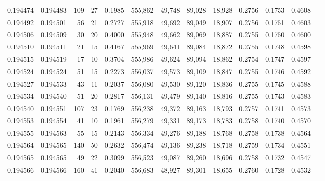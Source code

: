 \begin{tabular}{rrrrrrrrrrrrr}
0.194474 & 0.194483 &   109 &  27 &                                     0.1985 & 555,862 &  49,748 &  89,028 &  18,928 & 0.2756 & 0.1753 & 0.4608 \\
0.194492 & 0.194501 &    56 &  21 &                                     0.2727 & 555,918 &  49,692 &  89,049 &  18,907 & 0.2756 & 0.1751 & 0.4603 \\
0.194506 & 0.194509 &    30 &  20 &                                     0.4000 & 555,948 &  49,662 &  89,069 &  18,887 & 0.2755 & 0.1750 & 0.4600 \\
0.194510 & 0.194511 &    21 &  15 &                                     0.4167 & 555,969 &  49,641 &  89,084 &  18,872 & 0.2755 & 0.1748 & 0.4598 \\
0.194515 & 0.194519 &    17 &  10 &                                     0.3704 & 555,986 &  49,624 &  89,094 &  18,862 & 0.2754 & 0.1747 & 0.4597 \\
0.194524 & 0.194524 &    51 &  15 &                                     0.2273 & 556,037 &  49,573 &  89,109 &  18,847 & 0.2755 & 0.1746 & 0.4592 \\
0.194527 & 0.194533 &    43 &  11 &                                     0.2037 & 556,080 &  49,530 &  89,120 &  18,836 & 0.2755 & 0.1745 & 0.4588 \\
0.194534 & 0.194540 &    51 &  20 &                                     0.2817 & 556,131 &  49,479 &  89,140 &  18,816 & 0.2755 & 0.1743 & 0.4583 \\
0.194540 & 0.194551 &   107 &  23 &                                     0.1769 & 556,238 &  49,372 &  89,163 &  18,793 & 0.2757 & 0.1741 & 0.4573 \\
0.194553 & 0.194554 &    41 &  10 &                                     0.1961 & 556,279 &  49,331 &  89,173 &  18,783 & 0.2758 & 0.1740 & 0.4570 \\
0.194555 & 0.194563 &    55 &  15 &                                     0.2143 & 556,334 &  49,276 &  89,188 &  18,768 & 0.2758 & 0.1738 & 0.4564 \\
0.194564 & 0.194565 &   140 &  50 &                                     0.2632 & 556,474 &  49,136 &  89,238 &  18,718 & 0.2759 & 0.1734 & 0.4551 \\
0.194565 & 0.194565 &    49 &  22 &                                     0.3099 & 556,523 &  49,087 &  89,260 &  18,696 & 0.2758 & 0.1732 & 0.4547 \\
0.194566 & 0.194566 &   160 &  41 &                                     0.2040 & 556,683 &  48,927 &  89,301 &  18,655 & 0.2760 & 0.1728 & 0.4532 \\

\end{tabular}
